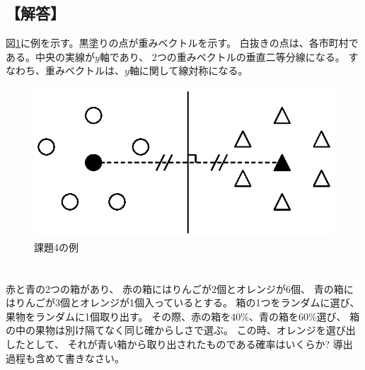 \documentclass[a4j]{jarticle}
\begin{document}
\subsection{【解答】}
図\ref{fig:problem04}に例を示す。黒塗りの点が重みベクトルを示す。
白抜きの点は、各市町村である。中央の実線が$y$軸であり、
2つの重みベクトルの垂直二等分線になる。
すなわち、重みベクトルは、$y$軸に関して線対称になる。

\begin{figure}[tbp]
 \begin{center}
  \includegraphics[width=0.5\hsize]{fig/problem04.eps}
 \end{center}
 \caption{課題4の例}
 \label{fig:problem04}
\end{figure}

\section{}
赤と青の2つの箱があり、
赤の箱にはりんごが2個とオレンジが6個、
青の箱にはりんごが3個とオレンジが1個入っているとする。
箱の1つをランダムに選び、果物をランダムに1個取り出す。
その際、赤の箱を40\%、青の箱を60\%選び、
箱の中の果物は別け隔てなく同じ確からしさで選ぶ。
この時、オレンジを選び出したとして、
それが青い箱から取り出されたものである確率はいくらか?
導出過程も含めて書きなさい。
\end{document}
